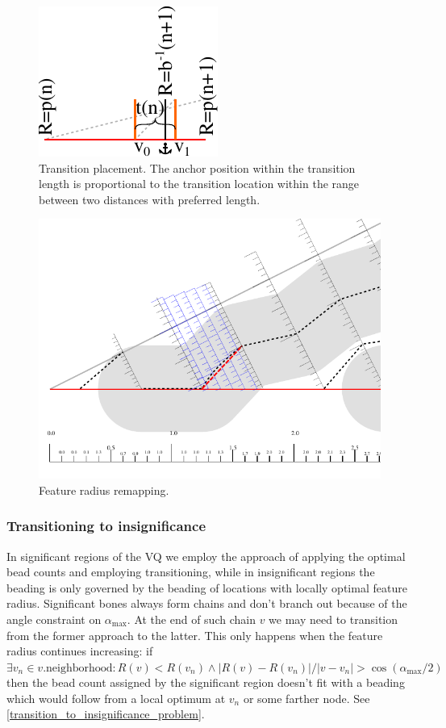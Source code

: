 \begin{figure}
\centering
\includegraphics[width=.3\columnwidth]{sources/method/transition_location_precise.pdf}
\caption{
Transition placement.
The anchor position within the transition length is proportional to the transition location within the range between two distances with preferred length. 
}
\label{transition_placement}
\end{figure}


\begin{figure}
\centering
\includegraphics[width=.9\columnwidth]{sources/method/distance_rounding_transition.pdf}
\caption{Feature radius remapping.}
\label{distance_rounding_transition}
\end{figure}


\subsubsection{Transitioning to insignificance}
In significant regions of the VQ we employ the approach of applying the optimal bead counts and employing transitioning, while in insignificant regions the beading is only governed by the beading of locations with locally optimal feature radius.
Significant bones always form chains and don't branch out because of the angle constraint on $\alpha_\text{max}$.
At the end of such chain $v$ we may need to transition from the former approach to the latter.
This only happens when the feature radius continues increasing: if $\exists v_n \in v.\text{neighborhood}: R(v) < R(v_n) \land | R(v) - R(v_n) | / |v - v_n| >  \cos(\alpha_\text{max} / 2)$ then the bead count assigned by the significant region doesn't fit with a beading which would follow from a local optimum at $v_n$ or some farther node.
See \cref{transition_to_insignificance_problem}.


